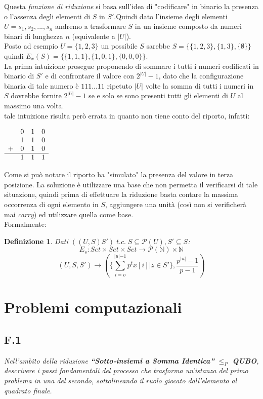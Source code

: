 \documentclass[a4paper]{article}
\newtheorem*{definition}{Definizione}
\begin{document}
Questa \textit{funzione di riduzione} si basa sull'idea di "codificare" in binario la presenza o l'assenza degli elementi di $S$ in $S'$.Quindi dato l'insieme degli elementi $U={s_1, s_2,...,s_n}$ andremo a trasformare $S$ in un insieme composto da numeri binari di lunghezza $n$ (equivalente a $|U|$).\\
Posto ad esempio $U = \{1,2,3\}$ un possibile $S$ sarebbe $S= \{\{1,2,3\},\{1,3\},\{\emptyset\}\}$ quindi $E_x(S) = \{\{1,1,1\},\{1,0,1\},\{0,0,0\}\}$.\\
La prima intuizione prosegue proponendo di sommare i tutti i numeri codificati in binario di $S'$ e di confrontare il valore con $2^{|U|}-1$, dato che la configurazione binaria di tale numero è $111...11$ ripetuto $|U|$ volte la somma di tutti i numeri in $S$ dovrebbe fornire $2^{|U|}-1$ se e solo se sono presenti tutti gli elementi di $U$ al massimo una volta.\\
tale intuizione risulta però errata in quanto non tiene conto del riporto, infatti:
\begin{center}$\begin{array}{llll}
  & 0 & 1  & 0  \\ %
  & 1 & 1  & 0  \\	%
+ &  0 & 1  & 0  \\ %
\hline
  &  1 & 1  & 1  \\ %
\end{array}$
\end{center}
Come si può notare il riporto ha "simulato" la presenza del valore in terza posizione.
La soluzione è utilizzare una base che non permetta il verificarsi di tale situazione, quindi prima di effettuare la riduzione basta contare la massima occorrenza di ogni elemento in $S$, aggiungere una unità (così non si verificherà mai \textit{carry}) ed utilizzare quella come base.
\\Formalmente:
\begin{definition}
	Dati $((U,S)S') \; t.c. \; S \subseteq \mathcal{P}(U), S' \subseteq S$:
	$$ E_s: Set \times Set \times Set \rightarrow \mathcal{P}(\mathbb{N}) \times \mathbb{N}$$
	$$(U,S,S') \rightarrow (\{\sum_{i=o}^{\rvert u \lvert -1} p^tx[i] | z \in S'\}, \frac{p^{\rvert u \lvert} -1}{p -1})$$
\end{definition}
\newpage
{}
\section{Problemi computazionali}
\subsection{F.1}
\label{SEC:F1}
\emph{Nell’ambito della riduzione \textbf{“Sotto-insiemi a Somma Identica”} $\leq_P$ \textbf{QUBO}, descrivere i passi fondamentali del processo che trasforma un’istanza del primo problema in una del secondo, sottolineando il ruolo giocato dall’elemento al quadrato finale.}
\end{document}
